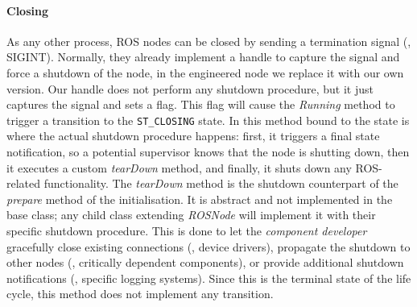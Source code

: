 \paragraph{Closing} As any other process, ROS nodes can be closed by sending a termination signal (\ie, SIGINT). Normally, they already implement a handle to capture the signal and force a shutdown of the node, in the engineered node we replace it with our own version. Our handle does not perform any shutdown procedure, but it just captures the signal and sets a flag. This flag will cause the \textit{Running} method to trigger a transition to the \texttt{ST\_CLOSING} state.  In this method bound to the state is where the actual shutdown procedure happens: first, it triggers a final state notification, so a potential supervisor knows that the node is shutting down, then it executes a custom \textit{tearDown} method, and finally, it shuts down any ROS-related functionality. The \textit{tearDown} method is the shutdown counterpart of the \textit{prepare} method of the initialisation. It is abstract and not implemented in the base class; any child class extending \textit{ROSNode} will implement it with their specific shutdown procedure. This is done to let the \textit{component developer} gracefully close existing connections (\eg, device drivers), propagate the shutdown to other nodes (\eg, critically dependent components), or provide additional shutdown notifications (\eg, specific logging systems). Since this is the terminal state of the life cycle, this method does not implement any transition.

